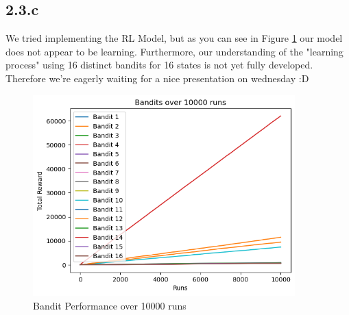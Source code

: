 \documentclass{article} %
\begin{document}
	
	\subsection{2.3.c}
	We tried implementing the RL Model, but as you can see in Figure \ref{fig:6} our model does not appear to be learning. Furthermore, our understanding of the "learning process" using 16 distinct bandits for 16 states is not yet fully developed. Therefore we're eagerly waiting for a nice presentation on wednesday :D 
	
	\begin{figure}[h!]
		\centering
		\includegraphics[width=0.9\textwidth]{images/bandits_over_10000_runs.png}
		\caption{Bandit Performance over 10000 runs}
		\label{fig:6}
	\end{figure}
	
	
	
\end{document}
